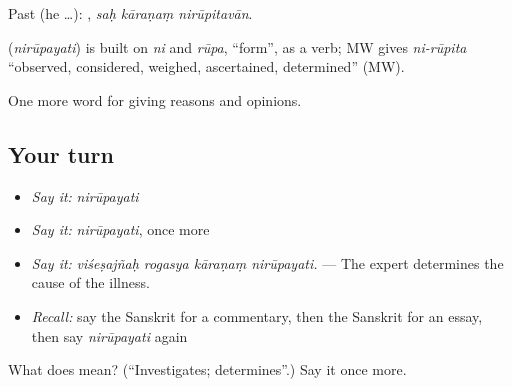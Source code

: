 Past (he …):   , \emph{saḥ kāraṇaṃ nirūpitavān}.

\begin{cousinweb}
\textbf{} (\emph{nirūpayati}) is built on \emph{ni} and \emph{rūpa}, \textquotedblleft{}form\textquotedblright{}, as a verb; MW gives \emph{ni-rūpita} \textquotedblleft{}observed, considered, weighed, ascertained, determined\textquotedblright{} (MW).
\end{cousinweb}

\begin{grammarlens}[title={What you've built}]
One more word for giving reasons and opinions.
\end{grammarlens}

\subsection*{Your turn}
\begin{itemize}
\raggedright
  \item \emph{Say it:} \emph{nirūpayati}
  \item \emph{Say it:} \emph{nirūpayati}, once more
  \item \emph{Say it:} \emph{viśeṣajñaḥ rogasya kāraṇaṃ nirūpayati.} — The expert determines the cause of the illness.
  \item \emph{Recall:} say the Sanskrit for a commentary, then the Sanskrit for an essay, then say \emph{nirūpayati} again
\end{itemize}

\begin{tcolorbox}[breakable,colback=teal!4,colframe=teal!35!black,title={Before you move on}]
What does  mean? (\textquotedblleft{}Investigates; determines\textquotedblright{}.) Say it once more.
\end{tcolorbox}

